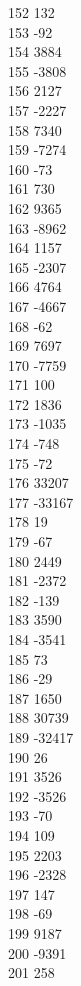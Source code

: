 { 152	132 \\
 153	-92 \\
 154	3884 \\
 155	-3808 \\
 156	2127 \\
 157	-2227 \\
 158	7340 \\
 159	-7274 \\
 160	-73 \\
 161	730 \\
 162	9365 \\
 163	-8962 \\
 164	1157 \\
 165	-2307 \\
 166	4764 \\
 167	-4667 \\
 168	-62 \\
 169	7697 \\
 170	-7759 \\
 171	100 \\
 172	1836 \\
 173	-1035 \\
 174	-748 \\
 175	-72 \\
 176	33207 \\
 177	-33167 \\
 178	19 \\
 179	-67 \\
 180	2449 \\
 181	-2372 \\
 182	-139 \\
 183	3590 \\
 184	-3541 \\
 185	73 \\
 186	-29 \\
 187	1650 \\
 188	30739 \\
 189	-32417 \\
 190	26 \\
 191	3526 \\
 192	-3526 \\
 193	-70 \\
 194	109 \\
 195	2203 \\
 196	-2328 \\
 197	147 \\
 198	-69 \\
 199	9187 \\
 200	-9391 \\
 201	258 \\
}
